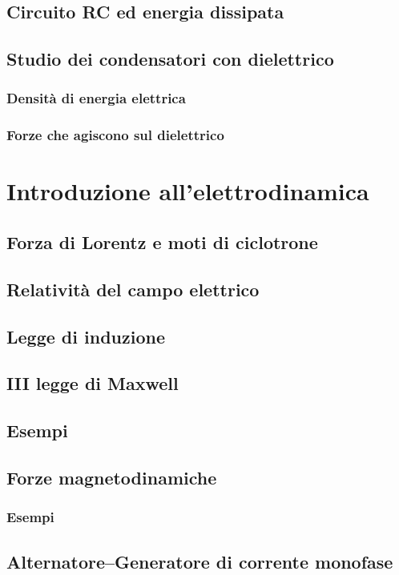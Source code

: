 \documentclass{book}
\begin{document}
\section{Circuito RC ed energia dissipata}
\section{Studio dei condensatori con dielettrico}
\subsection{Densit\`a di energia elettrica}
\subsection{Forze che agiscono sul dielettrico}

\chapter{Introduzione all'elettrodinamica}
\section{Forza di Lorentz e moti di ciclotrone}
\section{Relativit\`a del campo elettrico}
\section{Legge di induzione}
\section{III legge di Maxwell}
\section{Esempi}
\section{Forze magnetodinamiche}
\subsection{Esempi}
\section{Alternatore--Generatore di corrente monofase}
\end{document}
